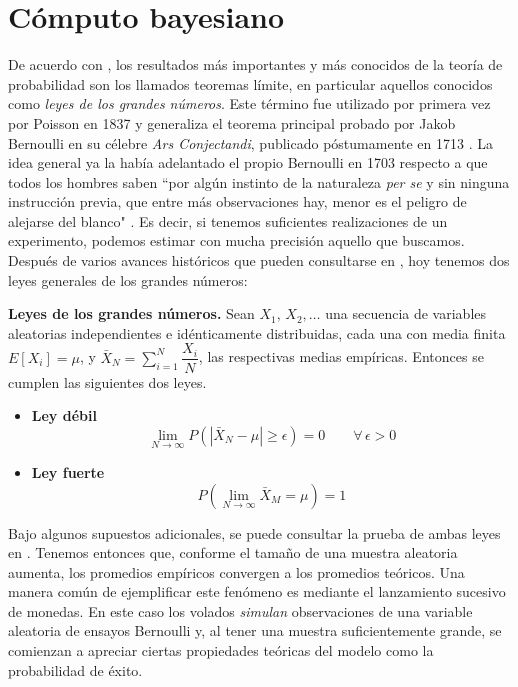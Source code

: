 \chapter{Cómputo bayesiano}

De acuerdo con \textcite{Ross10}, los resultados más importantes y más conocidos de la teoría de probabilidad son los llamados teoremas límite, en particular aquellos conocidos como \textit{leyes de los grandes números}. Este término fue utilizado por primera vez por Poisson en 1837 y generaliza el teorema principal probado por Jakob Bernoulli en su célebre \textit{Ars Conjectandi}, publicado póstumamente en 1713 \parencite{Seneta13}. La idea general ya la había adelantado el propio Bernoulli en 1703 respecto a que todos los hombres saben ``por algún instinto de la naturaleza \textit{per se} y sin ninguna instrucción previa, que entre más observaciones hay, menor es el peligro de alejarse del blanco" \parencite{Pulskamp09}. Es decir, si tenemos suficientes realizaciones de un experimento, podemos estimar con mucha precisión aquello que buscamos.\\ 

Después de varios avances históricos que pueden consultarse en \textcite{Seneta13}, hoy tenemos dos leyes generales de los grandes números:

\begin{teo} \label{teo:LGN}
\textbf{Leyes de los grandes números.}
Sean $X_1,\,X_2,\dots$ una secuencia de variables aleatorias independientes e idénticamente distribuidas, cada una con media finita $E[X_i]=\mu$, y $\bar{X}_N=\sum\limits_{i=1}^N\dfrac{X_i}{N}$, las respectivas medias empíricas. Entonces se cumplen las siguientes dos leyes.\\ 
\begin{itemize}
\item \textbf{Ley débil}
\begin{equation*}
\lim_{N \to \infty} P\left( |\bar{X}_N-\mu| \geq \epsilon \right)  = 0 \qquad \forall \, \epsilon > 0
\end{equation*}
\item \textbf{Ley fuerte}
\begin{equation*}
P\left(\lim_{N \to \infty} \bar{X}_M = \mu \right)  = 1 
\end{equation*}
\end{itemize}
\end{teo}

Bajo algunos supuestos adicionales, se puede consultar la prueba de ambas leyes en \textcite{Ross10}. Tenemos entonces que, conforme el tamaño de una muestra aleatoria aumenta, los promedios empíricos convergen a los promedios teóricos. Una manera común de ejemplificar este fenómeno es mediante el lanzamiento sucesivo de monedas. En este caso los volados \textit{simulan} observaciones de una variable aleatoria de ensayos Bernoulli y, al tener una muestra suficientemente grande, se comienzan a apreciar ciertas propiedades teóricas del modelo como la probabilidad de éxito.\\


